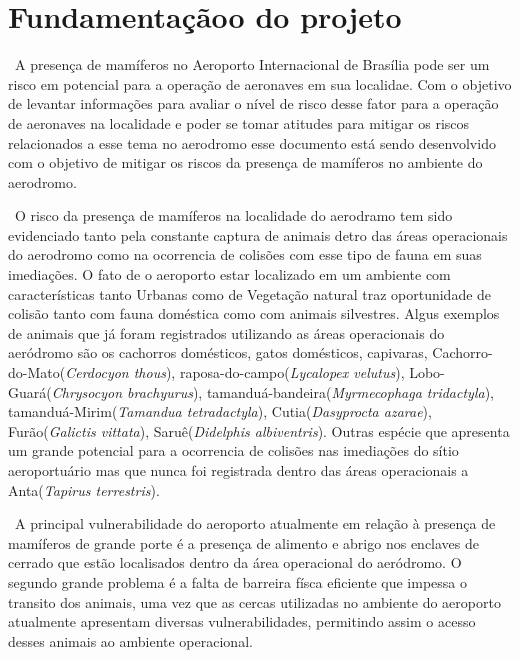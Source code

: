 \documentclass[a4paper,16,onecolumn]{article}
\begin{document}
\begin{itemize}
\begin{itemize}
\begin{itemize}
\end{itemize}

\end{itemize}
\section{Fundamentaçãoo do projeto}

\ A presença de mamíferos no Aeroporto Internacional de Brasília pode ser um risco em potencial para a operação de aeronaves em sua localidae. Com o objetivo de levantar informações para avaliar o nível de risco desse fator para a operação de aeronaves na localidade e poder se tomar atitudes para mitigar os riscos relacionados a esse tema no aerodromo esse documento está sendo desenvolvido com o objetivo de mitigar os riscos da presença de mamíferos no ambiente do aerodromo.

\ O risco da presença de mamíferos na localidade do aerodramo tem sido evidenciado tanto pela constante captura de animais detro das áreas operacionais do aerodromo como na ocorrencia de colisões com esse tipo de fauna em suas imediações. O fato de o aeroporto estar localizado em um ambiente com características tanto Urbanas como de Vegetação natural traz oportunidade de colisão tanto com fauna doméstica como com animais silvestres. Algus exemplos de animais que já foram registrados utilizando as áreas operacionais do aeródromo são os cachorros domésticos, gatos domésticos, capivaras, Cachorro-do-Mato(\emph{Cerdocyon thous}), raposa-do-campo(\emph{Lycalopex velutus}), Lobo-Guará(\emph{Chrysocyon brachyurus}), tamanduá-bandeira(\emph{Myrmecophaga tridactyla}), tamanduá-Mirim(\emph{Tamandua tetradactyla}), Cutia(\emph{Dasyprocta azarae}), Furão(\emph{Galictis vittata}), Saruê(\emph{Didelphis albiventris}). Outras espécie que apresenta um grande potencial para a ocorrencia de colisões nas imediações do sítio aeroportuário mas que nunca foi registrada dentro das áreas operacionais a Anta(\emph{Tapirus terrestris}).

\ A principal vulnerabilidade do aeroporto atualmente em relação à presença de mamíferos de grande porte é a presença de alimento e abrigo nos enclaves de cerrado que estão localisados dentro da área operacional do aeródromo. O segundo grande problema é a falta de barreira físca eficiente que impessa o transito dos animais, uma vez que as cercas utilizadas no ambiente do aeroporto atualmente apresentam diversas vulnerabilidades, permitindo assim o acesso desses animais ao ambiente operacional.


\end{itemize}
\end{document}

